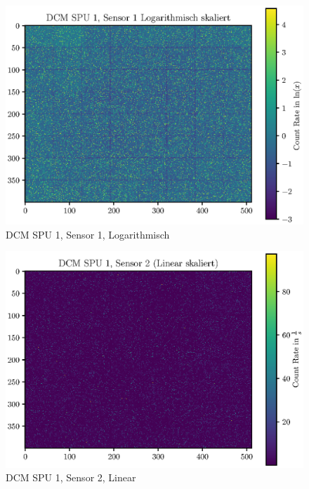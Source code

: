 \documentclass[12pt,twoside,a4paper]{scrartcl}
\begin{document}
		\begin{figure}[H]
			\includegraphics[width = \textwidth]{Plots/DCM/DCM_SPU1_Sensor1_log.eps}
			\caption{DCM SPU 1, Sensor 1, Logarithmisch}
		\end{figure}

		\begin{figure}[H]
			\includegraphics[width = \textwidth]{Plots/DCM/DCM_SPU1_Sensor2_lin.eps}
			\caption{DCM SPU 1, Sensor 2, Linear}
		\end{figure}
\end{document}
